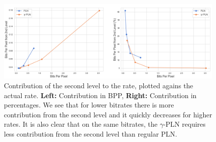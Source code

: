 \documentclass{article}
\begin{document}
\begin{figure}
  \centering
  \includegraphics[width=\textwidth]{../img/plots/kodak_side_info/kodim01_side_info}
  \caption{Contribution of the second level to the rate, plotted agains the
    actual rate. \textbf{Left:} Contribution in BPP, \textbf{Right:}
    Contribution in percentages. We see that for lower bitrates there is more
    contribution from the second level and it quickly decreases for higher
    rates. It is also clear that on the same bitrates, the $\gamma$-PLN requires
    less contribution from the second level than regular PLN.}
  \label{fig:kodim01_side_info}
\end{figure}
\end{document}
